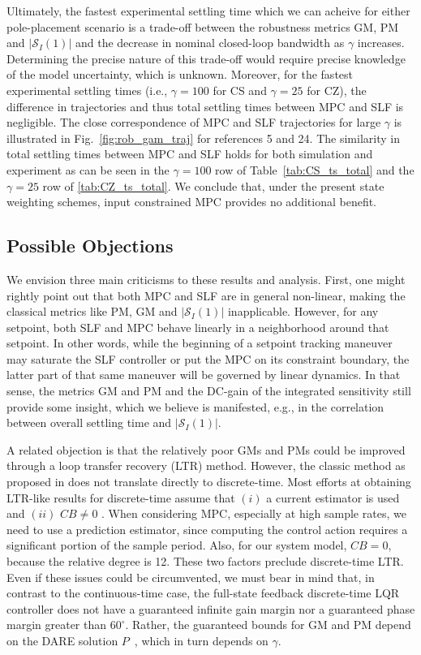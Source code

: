 \documentclass[twocolumn,twoside]{IEEEtran}
\begin{document}
Ultimately, the fastest experimental settling time which we can acheive for either pole-placement scenario is a trade-off between the robustness metrics GM, PM and $|\mathcal{S}_I(1)|$ and the decrease in nominal closed-loop bandwidth as $\gamma$ increases. Determining the precise nature of this trade-off would require precise knowledge of the model uncertainty, which is unknown. Moreover, for the fastest experimental settling times (i.e., ${\gamma=100}$ for CS and ${\gamma=25}$ for CZ), the difference in trajectories and thus total settling times between MPC and SLF is negligible. The close correspondence of MPC and SLF trajectories for large $\gamma$ is illustrated in Fig.~\ref{fig:rob_gam_traj} for references 5 and 24. The similarity in total settling times between MPC and SLF holds for both simulation and experiment as can be seen in the ${\gamma=100}$ row of Table~\ref{tab:CS_ts_total} and the ${\gamma=25}$ row of \ref{tab:CZ_ts_total}. We conclude that, under the present state weighting schemes, input constrained MPC provides no additional benefit.


\subsection{Possible Objections}
We envision three main criticisms to these results and analysis. First, one might rightly point out that both MPC and SLF are in general non-linear, making the classical metrics like PM, GM and $|\mathcal{S}_I(1)|$ inapplicable. However, for any setpoint, both SLF and MPC behave linearly in a neighborhood around that setpoint. In other words, while the beginning of a setpoint tracking maneuver may saturate the SLF controller or put the MPC on its constraint boundary, the latter part of that same maneuver will be governed by linear dynamics. In that sense, the metrics GM and PM and the DC-gain of the integrated sensitivity still provide some insight, which we believe is manifested, e.g., in the correlation between overall settling time and $|\mathcal{S}_I(1)|$.

A related objection is that the relatively poor GMs and PMs could be improved through a loop transfer recovery (LTR) method. However, the classic method as proposed in \cite{doyle_robustness_1979} does not translate directly to discrete-time. Most efforts at obtaining LTR-like results for discrete-time assume that $(i)$ a current estimator is used and $(ii)$ $CB\neq 0$ \cite{Maciejowski_asymptotic_1985,guaracy_discrete_2015,ishihara_loop_1986}. When considering MPC, especially at high sample rates, we need to use a prediction estimator, since computing the control action requires a significant portion of the sample period. Also, for our system model, $CB=0$, because the relative degree is 12. These two factors preclude discrete-time LTR. Even if these issues could be circumvented, we must bear in mind that, in contrast to the continuous-time case, the full-state feedback discrete-time LQR controller does not have a guaranteed infinite gain margin nor a guaranteed phase margin greater than $60^{\circ}$. Rather, the guaranteed bounds for GM and PM depend on the DARE solution $P$~\cite[p. 136]{andersson_moore}, which in turn depends on $\gamma$. 
\end{document}
